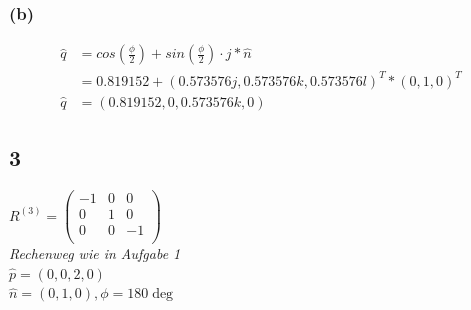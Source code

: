 \documentclass{../Vorlage/mat}
\begin{document}
\subsubsection*{(b)}
\begin{align*}
\hat{q} & = cos(\frac{\phi}{2}) + sin(\frac{\phi}{2}) \cdot j * \hat{n}\\
& = 0.819152 + (0.573576j,0.573576k,0.573576l)^T * (0,1,0)^T\\
\hat{q} & = (0.819152, 0, 0.573576k, 0)
\end{align*}

\subsection*{3}
$R^{(3)} = \begin{pmatrix}
-1 & 0 & 0 \\
0 & 1 & 0\\
0 & 0 & -1\\
\end{pmatrix}
$\\
\textit{Rechenweg wie in Aufgabe 1}\\
$\hat{p} = \left(0,0,2,0\right)$\\
$\hat{n} =(0,1,0) , \phi = 180\deg$
\end{document}
